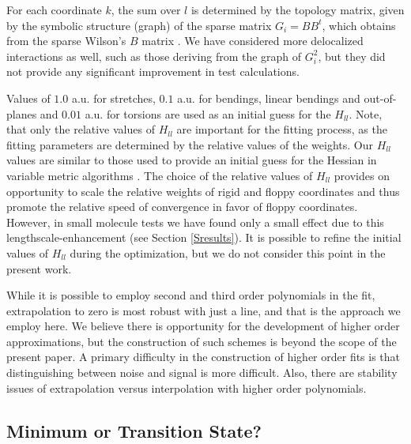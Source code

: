 \documentclass[prl,twocolumn,showpacs,twocolumngrid,superbib]{revtex4}
\begin{document}
For each coordinate $k$, the sum over $l$ is determined by the topology matrix, given by the symbolic 
structure (graph) of the sparse matrix $G_{i}=BB^{t}$, which obtains from the sparse Wilson's $B$ 
matrix \cite{wilson}.  We have considered more delocalized interactions as well, such as those deriving 
from the graph of $G_i^2$, but they did not provide any significant improvement in test calculations.

Values of $1.0$ a.u. for stretches, $0.1$ a.u. for bendings, linear bendings and out-of-planes and $0.01$ a.u.
for torsions are used as an 
initial guess for the $H_{ll}$. Note, that only the relative values of $H_{ll}$
are important for the fitting process, as the fitting parameters are determined
by the relative values of the weights. Our $H_{ll}$ values are similar to those used to provide 
an initial guess for the Hessian in variable metric algorithms \cite{bakken}.  
The choice of the relative values of $H_{ll}$ provides on opportunity to scale
the relative weights of rigid and floppy coordinates and thus
promote the relative speed of convergence in favor of floppy coordinates.
However, in small molecule tests we have found only a small effect
due to this lengthscale-enhancement (see Section \ref{Sresults}).
It is possible to refine the initial values of $H_{ll}$ during the 
optimization, but we do not consider this point in the present work.

While it is possible to employ second and third order polynomials in the fit, extrapolation
to zero is most robust with just a line, and that is the approach we employ here.  We believe there
is opportunity for the development of higher order approximations,  but the construction of such 
schemes is beyond the scope of the present paper.  A primary difficulty in the construction of higher 
order fits is that distinguishing between noise and signal is more difficult.  Also, there are stability 
issues of extrapolation versus interpolation with higher order polynomials.

\subsection{Minimum or Transition State?}
\end{document}
